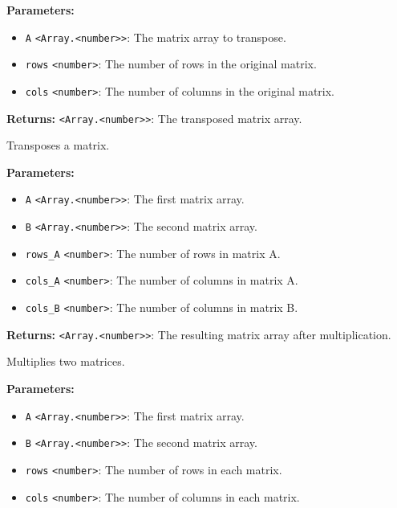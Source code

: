 \documentclass[12pt,a4paper]{article}
\begin{document}
\noindent \textbf{Parameters:}
\begin{itemize}
  \item \texttt{A} \texttt{<Array.<number>>}: The matrix array to transpose.
  \item \texttt{rows} \texttt{<number>}: The number of rows in the original matrix.
  \item \texttt{cols} \texttt{<number>}: The number of columns in the original matrix.
\end{itemize}

\noindent \textbf{Returns:} \texttt{<Array.<number>>}: The transposed matrix array.

\noindent Transposes a matrix.

\vspace{5mm}
\noindent {}


\noindent \textbf{Parameters:}
\begin{itemize}
  \item \texttt{A} \texttt{<Array.<number>>}: The first matrix array.
  \item \texttt{B} \texttt{<Array.<number>>}: The second matrix array.
  \item \texttt{rows\_A} \texttt{<number>}: The number of rows in matrix A.
  \item \texttt{cols\_A} \texttt{<number>}: The number of columns in matrix A.
  \item \texttt{cols\_B} \texttt{<number>}: The number of columns in matrix B.
\end{itemize}

\noindent \textbf{Returns:} \texttt{<Array.<number>>}: The resulting matrix array after multiplication.

\noindent Multiplies two matrices.

\vspace{5mm}
\noindent {}


\noindent \textbf{Parameters:}
\begin{itemize}
  \item \texttt{A} \texttt{<Array.<number>>}: The first matrix array.
  \item \texttt{B} \texttt{<Array.<number>>}: The second matrix array.
  \item \texttt{rows} \texttt{<number>}: The number of rows in each matrix.
  \item \texttt{cols} \texttt{<number>}: The number of columns in each matrix.
\end{itemize}
\end{document}
